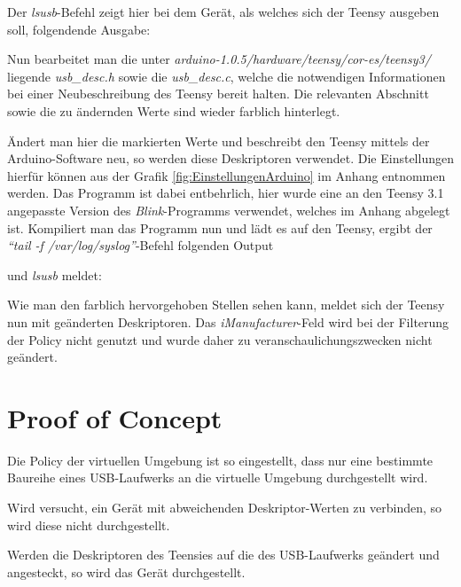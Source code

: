 Der \textit{lsusb}-Befehl zeigt hier bei dem Gerät, als welches sich der Teensy ausgeben soll, folgendende Ausgabe:



Nun bearbeitet man die unter \textit{arduino-1.0.5/hardware/teensy/cor-es/teensy3/} liegende \textit{usb\_desc.h} sowie die \textit{usb\_desc.c}, welche die notwendigen Informationen bei einer Neubeschreibung des Teensy bereit halten. Die relevanten Abschnitt sowie die zu ändernden Werte sind wieder farblich hinterlegt.





Ändert man hier die markierten Werte und beschreibt den Teensy mittels der Arduino-Software neu, so werden diese Deskriptoren verwendet. Die Einstellungen hierfür können aus der Grafik \ref{fig:EinstellungenArduino} im Anhang entnommen werden. Das Programm ist dabei entbehrlich, hier wurde eine an den Teensy 3.1 angepasste Version des \textit{Blink}-Programms verwendet, welches im Anhang abgelegt ist. Kompiliert man das Programm nun und lädt es auf den Teensy, ergibt der \textit{"`tail -f /var/log/syslog"'}-Befehl folgenden Output

\lstset{language=log}

und \textit{lsusb} meldet:


Wie man den farblich hervorgehoben Stellen sehen kann, meldet sich der Teensy nun mit geänderten Deskriptoren. Das \textit{iManufacturer}-Feld wird bei der Filterung der Policy nicht genutzt und wurde daher zu veranschaulichungszwecken nicht geändert.

\section{Proof of Concept} \label{PoC}
Die Policy der virtuellen Umgebung ist so eingestellt, dass nur eine  bestimmte Baureihe eines USB-Laufwerks an die virtuelle Umgebung durchgestellt wird.

\lstset{language=log}


Wird versucht, ein Gerät mit abweichenden Deskriptor-Werten zu verbinden, so wird diese nicht durchgestellt.



Werden die Deskriptoren des Teensies auf die des USB-Laufwerks geändert und angesteckt, so wird das Gerät durchgestellt.

